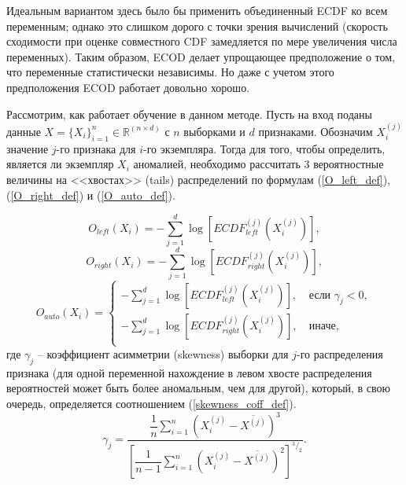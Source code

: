 Идеальным вариантом здесь было бы применить объединенный ECDF ко всем переменным; однако это слишком дорого с точки зрения вычислений (скорость сходимости при оценке совместного CDF замедляется по мере увеличения числа переменных). Таким образом, ECOD делает упрощающее предположение о том, что переменные статистически независимы. Но даже с учетом этого предположения ECOD работает довольно хорошо.

Рассмотрим, как работает обучение в данном методе. Пусть на вход поданы данные $X = \{X_i\}_{i=1}^n \in \mathbb{R}^{(n \times d)}$  с $n$ выборками и $d$ признаками. Обозначим $X_i^{(j)}$  значение $j$-го признака для $i$-го экземпляра. Тогда для того, чтобы определить, является ли экземпляр $X_i$  аномалией, необходимо рассчитать 3 вероятностные величины на <<хвостах>> (tails) распределений по формулам (\ref{O_left_def}), (\ref{O_right_def}) и (\ref{O_auto_def}).

\begin{equation}\label{O_left_def}
    O_{left}(X_i)= - \sum\limits_{j=1}^d \log \left[ECDF_{left}^{(j)} (X_i^{(j)} )\right],
\end{equation}
\begin{equation}\label{O_right_def}
    O_{right}(X_i)= - \sum\limits_{j=1}^d \log \left[ECDF_{right}^{(j)} (X_i^{(j)} )\right],
\end{equation}
\begin{equation}\label{O_auto_def}
    O_{auto}(X_i)= \begin{cases}
         - \sum\limits_{j=1}^d \log \left[ECDF_{left}^{(j)} (X_i^{(j)} )\right], &\ \text{если } \gamma_j < 0, \\
         - \sum\limits_{j=1}^d \log \left[ECDF_{right}^{(j)} (X_i^{(j)} )\right], &\ \text{иначе}, \\ 
    \end{cases}
\end{equation}
где $\gamma_j$  – коэффициент асимметрии (skewness) выборки для $j$-го распределения признака (для одной переменной нахождение в левом хвосте распределения вероятностей может быть более аномальным, чем для другой), который, в свою очередь, определяется соотношением (\ref{skewness_coff_def}).
\begin{equation}\label{skewness_coff_def}
    \gamma_j  =  \dfrac{\dfrac{1}{n} \sum\limits_{i = 1}^n \left(X_i^{(j)} - \overline{X^{(j)}}\right)^3}
                       {\left[\dfrac{1}{n-1} \sum\limits_{i = 1}^n \left(X_i^{(j)} - \overline{X^{(j)}}\right)^2 \right]^{^3/_2}}.
\end{equation}

